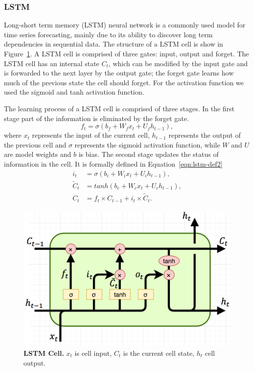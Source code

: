\documentclass[12pt,journal,compsoc]{IEEEtran}
\begin{document}
\subsubsection{LSTM}
\par Long-short term memory (LSTM) neural network is a commonly used model for time series forecasting, mainly due to its ability to discover long term dependencies in sequential data. The structure of a LSTM cell is show in Figure~\ref{fig:lstm-cell}. 
A LSTM cell is comprised of three gates: input, output and forget. The LSTM cell has an internal state $C_t$, which can be modified by the input gate and is forwarded to the next layer by the output gate; the forget gate learns how much of the previous state the cell should forget.
For the activation function we used the sigmoid and tanh activation function.
\par The learning process of a LSTM cell is comprised of three stages.
In the first stage part of the information is eliminated by the forget gate.
\begin{equation}
    f_t = \sigma(b_f + W_f x_t + U_f h_{t-1}),
\end{equation}
where $x_t$ represents the input of the current cell, $h_{t-1}$ represents the output of the previous cell and $\sigma$ represents the sigmoid activation function, while $W$ and $U$ are model weights and $b$ is bias.
The second stage updates the status of information in the cell.
It is formally defined in Equation~\ref{eqn:lstm-def2}
\begin{equation}
	\begin{aligned}
    i_t  &= \sigma(b_i + W_i x_t + U_i h_{t-1}), \\
    \widetilde{C}_t  &= tanh(b_c + W_c x_t + U_c h_{t-1}), \\
    C_t  &= f_t \times C_{t-1} + i_t \times \widetilde{C}_t.
    \end{aligned}
    \label{eqn:lstm-def2}
\end{equation}
\begin{figure}[!ht]\centering
	\includegraphics[width=\linewidth]{images/LSTM2.png}
	\caption{\textbf{LSTM Cell.} $x_t$ is cell input, $C_t$ is the current cell state, $h_t$ cell output.}
	\label{fig:lstm-cell}
\end{figure}
\end{document}
